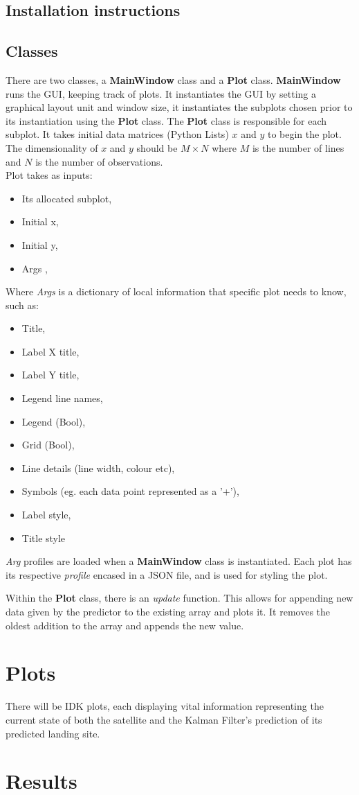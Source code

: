 \documentclass[12pt, a4paper]{article}
\begin{document}
\subsection{Installation instructions}
\subsection{Classes}
There are two classes, a \textbf{MainWindow} class and a \textbf{Plot} class. \textbf{MainWindow} runs the GUI, keeping track of plots. It instantiates the GUI by setting a graphical layout unit and window size, it instantiates the subplots chosen prior to its instantiation using the \textbf{Plot} class. The \textbf{Plot} class is responsible for each subplot. It takes initial data matrices (Python Lists) $x$ and $y$ to begin the plot. The dimensionality of $x$ and $y$ should be $M\times N$ where $M$ is the number of lines and $N$ is the number of observations. \\ 
Plot takes as inputs: 
\begin{itemize}
\item Its allocated subplot,
\item Initial x,
\item Initial y,
\item Args ,
\end{itemize}
Where \textit{Args} is a dictionary of local information that specific plot needs to know, such as:
\begin{itemize}
\item Title,
\item Label X title,
\item Label Y title,
\item Legend line names,
\item Legend (Bool),
\item Grid (Bool),
\item Line details (line width, colour etc),
\item Symbols (eg. each data point represented as a '+'),
\item Label style,
\item Title style
\end{itemize}

\textit{Arg} profiles are loaded when a \textbf{MainWindow} class is instantiated. Each plot has its respective \textit{profile} encased in a JSON file, and is used for styling the plot.

Within the \textbf{Plot} class, there is an \textit{update} function. This allows for appending new data given by the predictor to the existing array and plots it. It removes the oldest addition to the array and appends the new value. 
\section{Plots}
There will be IDK plots, each displaying vital information representing the current state of both the satellite and the Kalman Filter's prediction of its predicted landing site. 

\section{Results}
\end{document}
